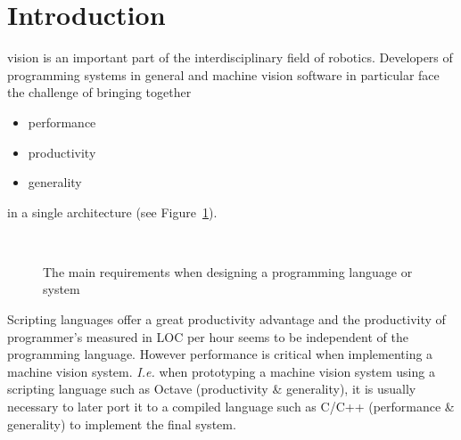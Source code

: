 \documentclass[10pt,journal,compsoc]{joser13}
\newcommand{\fig}[1]{Figure~\ref{fig:#1}}
\begin{document}
\maketitle


\section{Introduction}
 vision is an important part of the interdisciplinary
field of robotics. Developers of programming systems in general and machine
vision software in particular face the challenge of bringing together
\begin{itemize}
  \item performance
  \item productivity
  \item generality
\end{itemize}
in a single architecture (see \fig{triangle}).
\begin{figure}[htbp]
   \begin{center}
     \\
     \caption{The main requirements when designing a programming language or
     system \citep{wolczko2011}\label{fig:triangle}}
   \end{center}
\end{figure}

Scripting languages offer a great productivity advantage and the productivity
of programmer's measured in \ac{LOC} per hour seems to be independent of the
programming language\citep{prechelt2000empirical}. However performance is
critical when implementing a machine vision system. \emph{I.e.} when
prototyping a machine vision system using a scripting language such as Octave
(productivity \& generality), it is usually necessary to later port it to a
compiled language such as C/C++ (performance \& generality) to implement the
final system.
\end{document}
